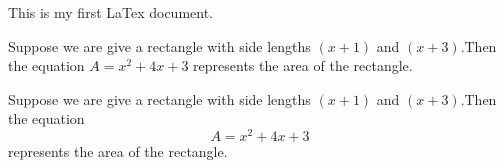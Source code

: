 \documentclass[11pt]{article}
\begin{document}
This is my first LaTex document.

Suppose we are give a rectangle with side
lengths $(x + 1)$ and $(x + 3)$.Then the equation 
$A=x^2+4x+3$ represents the area of the rectangle.

Suppose we are give a rectangle with side
lengths $(x + 1)$ and $(x + 3)$.Then the equation 
  $$A=x^2+4x+3$$ represents the area of the rectangle.
\end{document}

